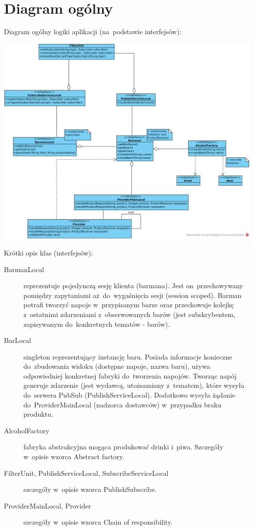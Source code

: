 \documentclass[11pt]{aghdpl}
\begin{document}
\section{Diagram ogólny}
Diagram ogólny logiki aplikacji (na~podstawie interfejsów):
\begin{center}
 \includegraphics[width=14cm]{overview}
\end{center}
Krótki opis klas (interfejsów):
\begin{description}
 \item[BarmanLocal] reprezentuje pojedynczą sesję klienta (barmana). Jest on~przechowywany pomiędzy zapytaniami aż~do~wygaśnięcia sesji (session scoped). Barman potrafi tworzyć napoje w~przypisanym barze oraz przechowuje kolejkę z~ostatnimi zdarzeniami z~obserwowanych barów (jest subskrybentem, zapisywanym do~konkretnych tematów - barów). 
 \item[BarLocal] singleton reprezentujący instancję baru. Posiada informacje konieczne do~zbudowania widoku (dostępne napoje, nazwa baru), używa odpowiedniej konkretnej fabryki do~tworzenia napojów. Tworząc napój generuje zdarzenie (jest wydawcą, utożsamiany z~tematem), które wysyła do~serwera PubSub (PublishServiceLocal). Dodatkowo wysyła żądanie do~ProviderMainLocal (nadzorca dostawców) w~przypadku braku produktu.
 \item[AlcoholFactory] fabryka abstrakcyjna mogąca produkować drinki i~piwa. Szczegóły w~opisie wzorca Abstract factory.
 \item[FilterUnit, PublishServiceLocal, SubscribeServiceLocal] szczegóły w~opisie wzorca PublishSubscribe.
 \item[ProviderMainLocal, Provider] szczegóły w~opisie wzorca Chain of responsibility.
\end{description}
\end{document}
